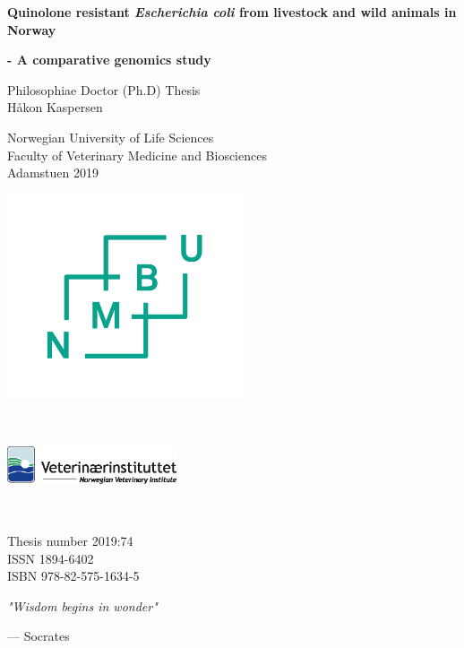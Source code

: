\frontmatter
{}
{
\pagestyle{empty}
\graphicspath{ {./images/} }
\begin{titlepage}
   \begin{center}
       
       \huge
       
       \textbf{Quinolone resistant \textit{Escherichia coli} from livestock and wild animals in Norway}
       
       \LARGE
       
       \textbf{- A comparative genomics study}
 
       \vspace{1.5cm}
       
       \large
       Philosophiae Doctor (Ph.D) Thesis\\
       Håkon Kaspersen
 
       \vspace{1cm}
       
       Norwegian University of Life Sciences\\
       Faculty of Veterinary Medicine and Biosciences\\
       Adamstuen 2019
       
       \includegraphics[height=6cm, width=7cm]{nmbu}
       
       \vspace{1cm}
       
       \includegraphics[height=3cm, width=5cm]{vetinst}
       
       \vfill

 
       \vspace{1cm}
       \normalsize
 
       Thesis number 2019:74\\
       ISSN 1894-6402\\
       ISBN 978-82-575-1634-5
 
   \end{center}
\end{titlepage}

\begin{titlepage}
   \null
   \vspace*{\fill}
   \renewcommand{\epigraphsize}{\large}
   \epigraph{\textit{"Wisdom begins in wonder"}}{--- \textup{Socrates}}
\end{titlepage}
}